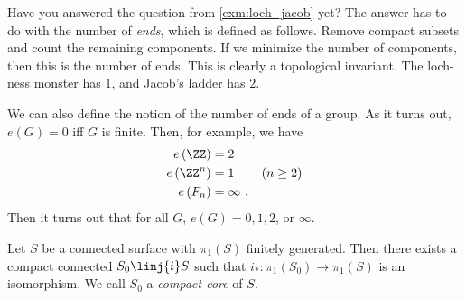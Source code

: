 \begin{rmk}
Have you answered the question from \cref{exm:loch_jacob} yet?
The answer has to do with the number of \emph{ends}, which is defined as follows.
Remove compact subsets and count the remaining components.
If we minimize the number of components, then this is the number of ends.
This is clearly a topological invariant.
The loch-ness monster has $1$, and Jacob's ladder has $2$.

We can also define the notion of the number of ends of a group.
As it turns out,
$e\left(G\right) = 0$ iff $G$ is finite.
Then, for example, we have
\begin{align*}
e\left(\ZZ\right) &= 2 \\
e\left(\ZZ^n\right) &= 1 \qquad \left(n\geq 2\right) \\
e\left(F_n\right) &= \infty
\ .
\end{align*}
Then it turns out that
for all $G$, $e\left(G\right) = 0,1,2$, or $\infty$.
\label{rmk:ends}
\end{rmk}

\begin{thm}
Let $S$ be a connected surface with $\pi_1\left(S\right)$ finitely generated. Then there
exists a compact connected $S_0 \linj{i} S$ such that 
$i_* : \pi_1\left(S_0\right) \to \pi_1\left(S\right)$ is an isomorphism. 
We call $S_0$ a \emph{compact core} of $S$.
\label{thm:2.17}
\end{thm}

